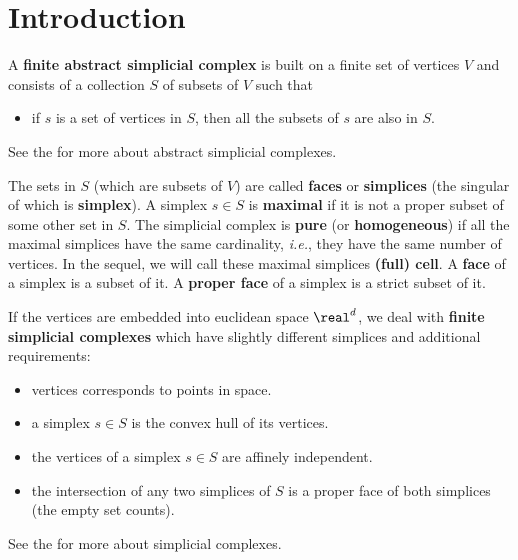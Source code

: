 
\newcommand{\note}[1]{\begin{ccTexOnly}%
{\color{red}$\langle\!\langle$#1$\rangle\!\rangle$}\end{ccTexOnly}}
\newcommand{\sphere}{\ensuremath{\mathcal S}}

\section{Introduction\label{triangulation:intro}}

A \textbf{finite abstract simplicial complex} is built on a finite set of
vertices $V$ and consists of a collection $S$ of subsets of $V$ such that
\begin{itemize}
\item if $s$ is a set of vertices in $S$, then all the subsets of $s$ are also
in $S$.
\end{itemize}
See the
 for more about abstract simplicial complexes.

The sets in $S$ (which are subsets of $V$) are called
\textbf{faces} or \textbf{simplices} (the
singular of which is \textbf{simplex}).
%
A simplex $s\in S$ is \textbf{maximal} if it is not a proper subset of some other
set in $S$. The simplicial complex is \textbf{pure} (or \textbf{homogeneous})
if all the maximal simplices have the same cardinality, \emph{i.e.}, they have the same
number of vertices. 
In the sequel, we will call these maximal simplices \textbf{(full) cell}.
A \textbf{face} of a simplex is a subset of it.
A \textbf{proper face} of a simplex is a strict subset of it.

If the vertices are embedded into euclidean space $\real^d$, we deal with
\textbf{finite simplicial complexes} which have slightly different simplices
and additional requirements:
\begin{itemize}
\item vertices corresponds to points in space.
\item a simplex $s\in S$ is the convex hull of its vertices.
\item the vertices of a simplex $s\in S$ are affinely independent.
\item the intersection of any two simplices of $S$ is a proper face of both
simplices (the empty set counts).
\end{itemize}
See the  for more about simplicial complexes.

